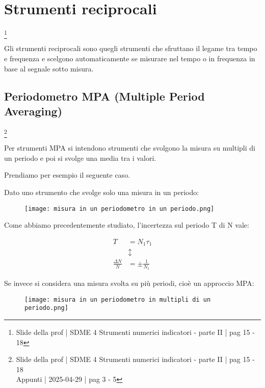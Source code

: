 \newpage 

\section{Strumenti reciprocali}
\footnote{Slide della prof | SDME 4 Strumenti numerici indicatori - parte II | pag 15 - 18}

Gli strumenti reciprocali sono quegli strumenti che sfruttano il legame tra tempo e frequenza e scelgono automaticamente 
se misurare nel tempo o in frequenza in base al segnale sotto misura. \newline 

\subsection{Periodometro MPA (Multiple Period Averaging)}
\footnote{Slide della prof | SDME 4 Strumenti numerici indicatori - parte II | pag 15 - 18 \\  
Appunti | 2025-04-29 | pag 3 - 5}

Per strumenti MPA si intendono strumenti che svolgono la misura su multipli di un periodo e poi si svolge una media tra i valori. \newline 

Prendiamo per esempio il seguente caso. \newline 

Dato uno strumento che svolge solo una misura in un periodo: 

\begin{figure}[h]
    \centering
    \texttt{[image: misura in un periodometro in un periodo.png]}
\end{figure}


Come abbiamo precedentemente studiato, l'incertezza sul periodo T di N vale:

{
    \Large 
    \begin{equation}
        \begin{split}
            T &= N_1 \tau_1
            \\ 
            &\updownarrow
            \\
            \frac{\Delta N}{N}
            &= 
            \pm 
            \frac{1}{N_1}
        \end{split}
    \end{equation}
}

Se invece si considera una misura svolta su più periodi, cioè un approccio MPA: 

\begin{figure}[h]
    \centering
    \texttt{[image: misura in un periodometro in multipli di un periodo.png]}
\end{figure}


